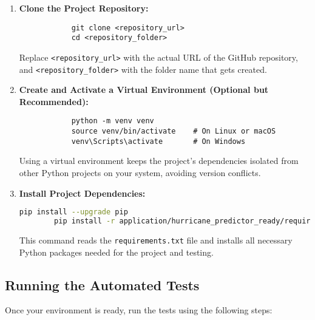 \begin{enumerate}
	\item \textbf{Clone the Project Repository:}
	\begin{framed}
		\begin{verbatim}
			git clone <repository_url>
			cd <repository_folder>
		\end{verbatim}
	\end{framed}
	Replace \texttt{<repository\_url>} with the actual URL of the GitHub repository, and \texttt{<repository\_folder>} with the folder name that gets created.
	
	\item \textbf{Create and Activate a Virtual Environment (Optional but Recommended):}
	\begin{framed}
		\begin{verbatim}
			python -m venv venv
			source venv/bin/activate    # On Linux or macOS
			venv\Scripts\activate       # On Windows
		\end{verbatim}
	\end{framed}
	Using a virtual environment keeps the project’s dependencies isolated from other Python projects on your system, avoiding version conflicts.
	
	\item \textbf{Install Project Dependencies:}

	\begin{lstlisting}[language=bash, basicstyle=\ttfamily\small]
		pip install --upgrade pip
		pip install -r application/hurricane_predictor_ready/requirements.txt
	\end{lstlisting}





	This command reads the \texttt{requirements.txt} file and installs all necessary Python packages needed for the project and testing.
\end{enumerate}

\subsection{Running the Automated Tests}

Once your environment is ready, run the tests using the following steps:

